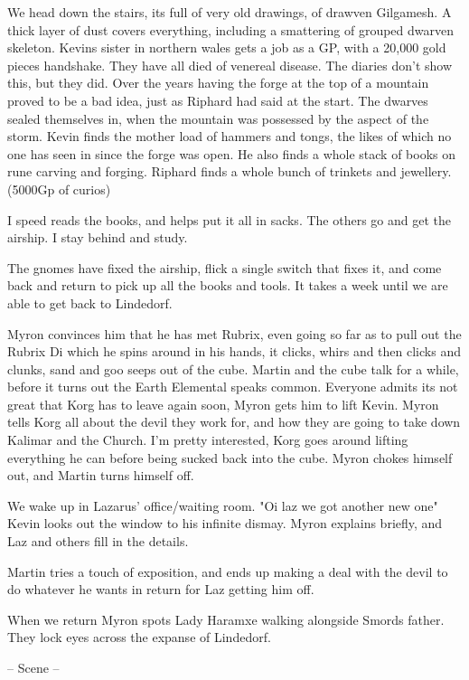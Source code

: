 We head down the stairs, its full of very old drawings, of drawven Gilgamesh. A thick layer of dust covers everything, including a smattering of grouped dwarven skeleton. Kevins sister in northern wales gets a job as a GP, with a 20,000 gold pieces handshake. They have all died of venereal disease. The diaries don't show this, but they did. Over the years having the forge at the top of a mountain proved to be a bad idea, just as Riphard had said at the start. The dwarves sealed themselves in, when the mountain was possessed by the aspect of the storm. Kevin finds the mother load of hammers and tongs, the likes of which no one has seen in since the forge was open. He also finds a whole stack of books on rune carving and forging. Riphard finds a whole bunch of trinkets and jewellery. (5000Gp of curios)\medskip

I speed reads the books, and helps put it all in sacks. The others go and get the airship. I stay behind and study.\medskip

The gnomes have fixed the airship, flick a single switch that fixes it, and come back and return to pick up all the books and tools. It takes a week until we are able to get back to Lindedorf.\medskip

Myron convinces him that he has met Rubrix, even going so far as to pull out the Rubrix Di which he spins around in his hands, it clicks, whirs and then clicks and clunks, sand and goo seeps out of the cube. Martin and the cube talk for a while, before it turns out the Earth Elemental speaks common. Everyone admits its not great that Korg has to leave again soon, Myron gets him to lift Kevin. Myron tells Korg all about the devil they work for, and how they are going to take down Kalimar and the Church. I'm pretty interested, Korg goes around lifting everything he can before being sucked back into the cube. Myron chokes himself out, and Martin turns himself off.\medskip

We wake up in Lazarus' office/waiting room. "Oi laz we got another new one" Kevin looks out the window to his infinite dismay. Myron explains briefly, and Laz and others fill in the details.\medskip

Martin tries a touch of exposition, and ends up making a deal with the devil to do whatever he wants in return for Laz getting him off.\medskip

When we return Myron spots Lady Haramxe walking alongside Smords father. They lock eyes across the expanse of Lindedorf.\medskip

-- Scene --\medskip

